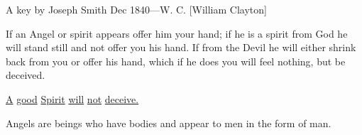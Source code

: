 				\begin{tightcenter}
					A key by Joseph Smith Dec 1840---W. C. [William Clayton]
				\end{tightcenter}
				
				If an Angel or spirit appears offer him your hand; if he is a spirit from God he will stand still and not offer you his hand. If from the Devil he will either shrink back from you or offer his hand, which if he does you will feel nothing, but be deceived.
				
				\uline{A} \uline{good} \uline{Spirit} \uline{will} \uline{not} \uline{deceive.}
				
				Angels are beings who have bodies and appear to men in the form of man.